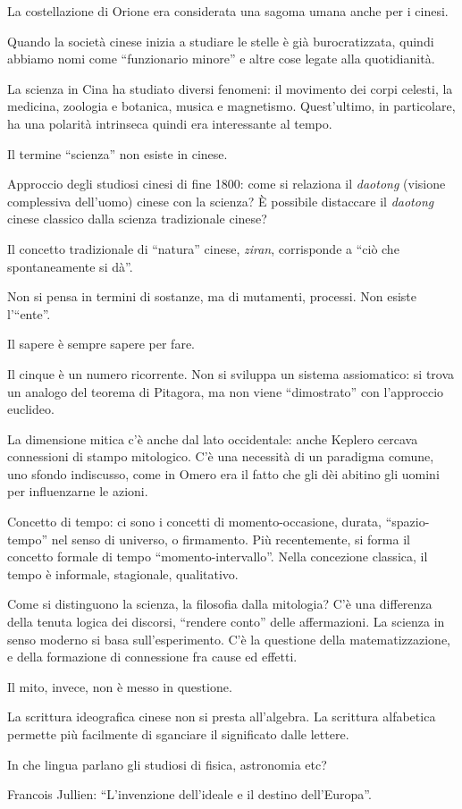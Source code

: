 \documentclass[main.tex]{subfiles}
\begin{document}
La costellazione di Orione era considerata una sagoma umana anche per i cinesi. 

Quando la società cinese inizia a studiare le stelle è già burocratizzata, quindi abbiamo nomi come ``funzionario minore'' e altre cose legate alla quotidianità. 

La scienza in Cina ha studiato diversi fenomeni: il movimento dei corpi celesti, la medicina, zoologia e botanica, musica e magnetismo. 
Quest'ultimo, in particolare, ha una polarità intrinseca quindi era interessante al tempo. 

Il termine ``scienza'' non esiste in cinese. 

Approccio degli studiosi cinesi di fine 1800: come si relaziona il \emph{daotong} (visione complessiva dell'uomo) cinese con la scienza?
È possibile distaccare il \emph{daotong} cinese classico dalla scienza tradizionale cinese?

Il concetto tradizionale di ``natura'' cinese, \emph{ziran}, corrisponde a ``ciò che spontaneamente si dà''. 

Non si pensa in termini di sostanze, ma di mutamenti, processi.
Non esiste l'``ente''. 

Il sapere è sempre sapere per fare. 

Il cinque è un numero ricorrente. 
Non si sviluppa un sistema assiomatico: si trova un analogo del teorema di Pitagora, ma non viene ``dimostrato'' con l'approccio euclideo.

La dimensione mitica c'è anche dal lato occidentale: anche Keplero cercava connessioni di stampo mitologico. 
C'è una necessità di un paradigma comune, uno sfondo indiscusso, come in Omero era il fatto che gli dèi abitino gli uomini per influenzarne le azioni. 

Concetto di tempo: ci sono i concetti di momento-occasione, durata, ``spazio-tempo'' nel senso di universo, o firmamento. 
Più recentemente, si forma il concetto formale di tempo ``momento-intervallo''. 
Nella concezione classica, il tempo è informale, stagionale, qualitativo.

Come si distinguono la scienza, la filosofia dalla mitologia? C'è una differenza della tenuta logica dei discorsi, ``rendere conto'' delle affermazioni. 
La scienza in senso moderno si basa sull'esperimento.
C'è la questione della matematizzazione, e della formazione di connessione fra cause ed effetti. 

Il mito, invece, non è messo in questione.

La scrittura ideografica cinese non si presta all'algebra.
La scrittura alfabetica permette più facilmente di sganciare il significato dalle lettere. 

In che lingua parlano gli studiosi di fisica, astronomia etc? 

Francois Jullien: ``L'invenzione dell'ideale e il destino dell'Europa''.
\end{document}
